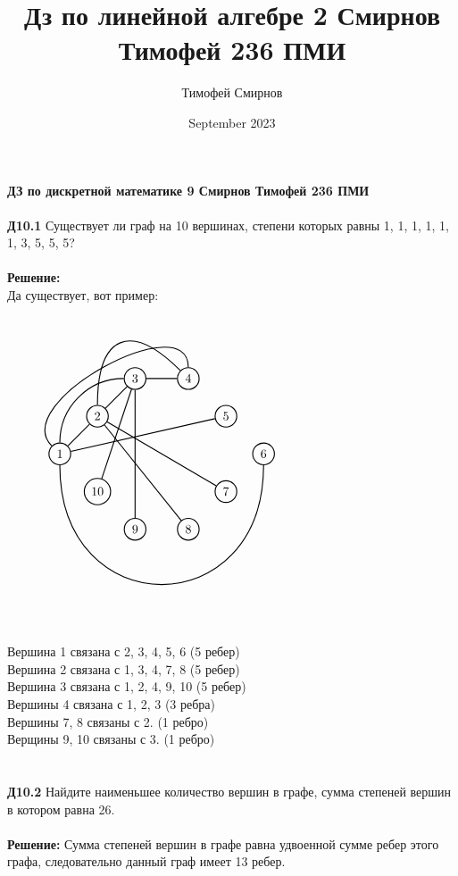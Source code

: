 \documentclass[a4paper, 12pt]{article}
\title{Дз по линейной алгебре 2 Смирнов Тимофей 236 ПМИ}
\author{Тимофей Смирнов}
\date{September 2023}
\begin{document}
    {\center \bf \large ДЗ по дискретной математике 9 Смирнов Тимофей 236 ПМИ}
    \\
    \\ \textbf{Д10.1} Существует ли граф на 10 вершинах, степени которых равны 1, 1, 1, 1, 1, 1, 3, 5, 5, 5?
    \\
    \\ \textbf{Решение: }
    \\ Да существует, вот пример:
    \\
    $\begin{tikzpicture}[node distance={15mm}, thick, main/.style = {draw, circle}] 
        \node[main] (1) {$1$}; 
        \node[main] (2) [above right of=1] {$2$}; 
        \node[main] (3) [above right of=2] {$3$}; 
        \node[main] (4) [right of=3] {$4$}; 
        \node[main] (5) [below right of=4] {$5$}; 
        \node[main] (6) [below right of=5] {$6$}; 
        \node[main] (7) [below left of=6] {$7$}; 
        \node[main] (8) [below left of=7] {$8$}; 
        \node[main] (9) [left of=8] {$9$}; 
        \node[main] (10) [above left of=9] {$10$}; 
        \draw[-] (1) -- (2); 
        \draw[-] (3) -- (4); 
        \draw(2) to [out=90, in=135,looseness=2] (4);
        \draw(1) to [out=90, in=180,looseness=1] (3); 
        \draw(1) to [out=135, in=90,looseness=1] (4);
        \draw[-] (1) -- (5);
        \draw(1) to [out=270, in=270,looseness=2] (6);
        \draw[-] (2) -- (3);
        \draw[-] (2) -- (7);
        \draw[-] (2) -- (8);
        \draw[-] (3) -- (9);
        \draw[-] (3) -- (10);
      \end{tikzpicture}$
      \\
      \\ Вершина 1 связана с 2, 3, 4, 5, 6 (5 ребер)
      \\ Вершина 2 связана с 1, 3, 4, 7, 8 (5 ребер)
      \\ Вершина 3 связана с 1, 2, 4, 9, 10 (5 ребер)
      \\ Вершины 4 связана с 1, 2, 3 (3 ребра)
      \\ Вершины 7, 8 связаны с 2. (1 ребро)
      \\ Верщины 9, 10 связаны с 3. (1 ребро)
      \\
    \\
    \\ \textbf{Д10.2} Найдите наименьшее количество вершин в графе, сумма степеней вершин в котором равна 26.
    \\
    \\ \textbf{Решение: } Сумма степеней вершин в графе равна удвоенной сумме ребер этого графа, следовательно данный граф имеет 13 ребер.
\end{document}
